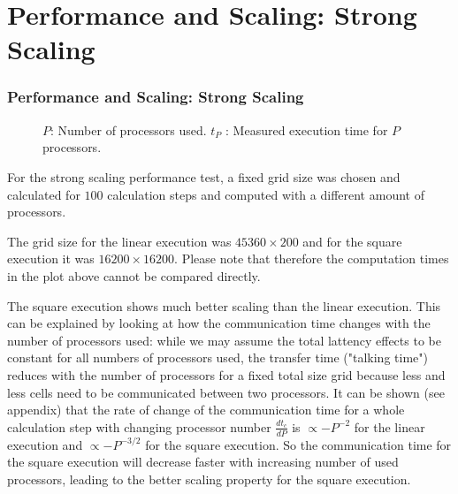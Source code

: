 \documentclass[8pt]{beamer}
\begin{document}
\section{Performance and Scaling: Strong Scaling}

\begin{frame}
	\frametitle{Performance and Scaling: Strong Scaling}
	
	\begin{figure}[H!]
		\caption*{$P$: Number of processors used. $t_P$ : Measured execution time for $P$ processors.}	
	\end{figure}
	
	For the strong scaling performance test, a fixed grid size was chosen and calculated for $100$ calculation steps and computed with a different amount of processors.
	
	The grid size for the linear execution was $45360 \times 200$ and for the square execution it was $16200 \times 16200$. Please note that therefore the computation times in the plot above cannot be compared directly.
	
	The square execution shows much better scaling than the linear execution. This can be explained by looking at how the communication time changes with the number of processors used: while we may assume the total lattency effects to be constant for all numbers of processors used, the transfer time ("talking time") reduces with the number of  
	processors for a fixed total size grid because less and less cells need to be communicated between two processors. It can be shown (see appendix) that the rate of change of the communication time for a whole calculation step with changing processor number $\frac{dt_{c}}{dP}$ is $\propto -P^{-2}$ for the linear execution and $\propto -P^{-3/2}$ for the square execution. So the communication time for the square execution will decrease faster with increasing number of used processors, leading to the better scaling property for the square execution.

\end{frame}
\end{document}
